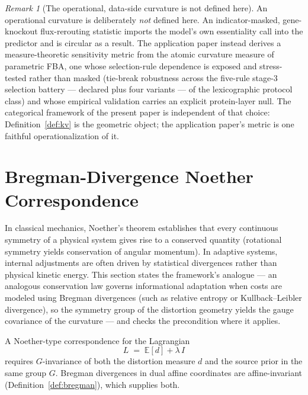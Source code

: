 \documentclass[11pt,a4paper]{article}
\theoremstyle{plain}
\theoremstyle{definition}
\theoremstyle{remark}
\newtheorem{remark}[theorem]{Remark}
\begin{document}
\begin{remark}[The operational, data-side curvature is not defined here]
\label{rem:operational-curvature}
An operational curvature is deliberately \emph{not} defined here. An
indicator-masked, gene-knockout flux-rerouting statistic imports
the model's own essentiality call into the predictor and is
circular as a result. The application paper \citep{zai2026measure}
instead derives a measure-theoretic sensitivity metric from the
atomic curvature measure of parametric FBA, one whose
selection-rule dependence is exposed and stress-tested rather than
masked (tie-break robustness across the five-rule stage-3 selection
battery --- declared plus four variants --- of the lexicographic
protocol class) and whose empirical validation carries an explicit
protein-layer null. The categorical framework of
the present paper is independent of that choice:
Definition~\ref{def:kv}
is the geometric object; the application paper's metric is one
faithful operationalization of it.
\end{remark}


\section{Bregman-Divergence Noether Correspondence}\label{sec:noether}

In classical mechanics, Noether's theorem establishes that every
continuous symmetry of a physical system gives rise to a conserved
quantity (rotational symmetry yields conservation of angular
momentum). In adaptive systems, internal adjustments are often
driven by statistical divergences rather than physical kinetic
energy. This section states the framework's analogue --- an
analogous conservation law governs informational adaptation when
costs are modeled using Bregman divergences (such as relative
entropy or Kullback--Leibler divergence), so the symmetry group of
the distortion geometry yields the gauge covariance of the
curvature --- and checks the precondition where it applies.

A Noether-type correspondence for the Lagrangian
\begin{equation}\label{eq:lagrangian}
  L \;=\; \mathbb{E}[d] + \lambda\, I
\end{equation}
requires $G$-invariance of both the distortion measure $d$ and the
source prior in the same group $G$. Bregman divergences in dual affine
coordinates are affine-invariant (Definition~\ref{def:bregman}), which
supplies both.
\end{document}

